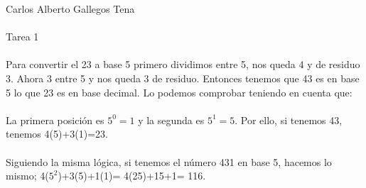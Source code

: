 \documentclass[a4paper,10pt]{article}
\title{}
\author{}
\date{}
\begin{document}
\maketitle
Carlos Alberto Gallegos Tena \\\\
Tarea 1\\\\
Para convertir el 23 a base 5 primero dividimos entre 5, nos queda 4 y de residuo 3. Ahora 3 entre 5 y nos queda 3 de residuo. Entonces tenemos que 43 es en base 5 lo que 23 es en base decimal. Lo podemos comprobar teniendo en cuenta que:\\\\
La primera posición es $5^0=1$ y la segunda es $5^1 = 5$. Por ello, si tenemos 43, tenemos 4(5)+3(1)=23.\\\\
Siguiendo la misma lógica, si tenemos el número 431 en base 5, hacemos lo mismo; 4($5^2$)+3(5)+1(1)= 4(25)+15+1= 116.
\end{document}
